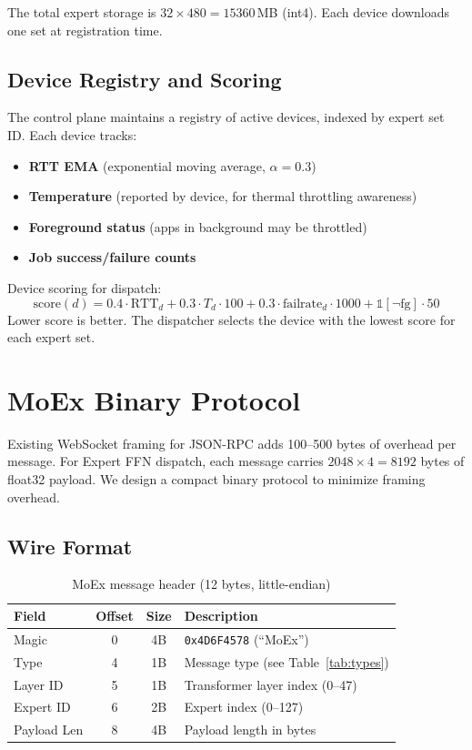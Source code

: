 \documentclass[11pt,a4paper]{article}
\begin{document}
The total expert storage is $32 \times 480 = 15360$\,MB (int4). Each
device downloads one set at registration time.

\subsection{Device Registry and Scoring}

The control plane maintains a registry of active devices, indexed by
expert set ID. Each device tracks:

\begin{itemize}
  \item \textbf{RTT EMA} (exponential moving average, $\alpha = 0.3$)
  \item \textbf{Temperature} (reported by device, for thermal
    throttling awareness)
  \item \textbf{Foreground status} (apps in background may be
    throttled)
  \item \textbf{Job success/failure counts}
\end{itemize}

Device scoring for dispatch:
\begin{equation}
  \text{score}(d) = 0.4 \cdot \text{RTT}_d + 0.3 \cdot T_d \cdot 100
    + 0.3 \cdot \text{failrate}_d \cdot 1000 + \mathbb{1}[\neg\text{fg}] \cdot 50
  \label{eq:score}
\end{equation}
Lower score is better. The dispatcher selects the device with the
lowest score for each expert set.

\section{MoEx Binary Protocol}
\label{sec:protocol}

Existing WebSocket framing for JSON-RPC adds 100--500 bytes of
overhead per message. For Expert FFN dispatch, each message carries
$2048 \times 4 = 8192$ bytes of float32 payload. We design a compact
binary protocol to minimize framing overhead.

\subsection{Wire Format}

\begin{table}[h]
\centering
\caption{MoEx message header (12 bytes, little-endian)}
\label{tab:header}
\begin{tabular}{@{}lccl@{}}
\toprule
Field & Offset & Size & Description \\
\midrule
Magic & 0 & 4B & \texttt{0x4D6F4578} (``MoEx'') \\
Type & 4 & 1B & Message type (see Table~\ref{tab:types}) \\
Layer ID & 5 & 1B & Transformer layer index (0--47) \\
Expert ID & 6 & 2B & Expert index (0--127) \\
Payload Len & 8 & 4B & Payload length in bytes \\
\bottomrule
\end{tabular}
\end{table}
\end{document}
